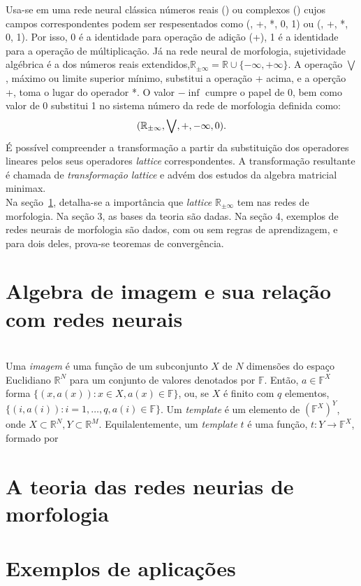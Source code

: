 \documentclass[12pt]{article}
\begin{document}
    Usa-se em uma rede neural clássica números reais () ou complexos () cujos campos correspondentes podem ser respesentados como (, +, *, 0, 1) ou (, +, *, 0, 1).
    Por isso, 0 é a identidade para operação de adição (+), 1 é a identidade para a operação de múltiplicação.
    Já na rede neural de morfologia, sujetividade algébrica é a  dos números reais extendidos,$\mathbb{R}_{\pm\infty} = \mathbb{R} \cup \{-\infty, +\infty\}$.
    A operação $\bigvee$, máximo ou limite superior mínimo, substitui a operação + acima, e a operção +, toma o lugar do operador *.
    O valor $-\inf$ cumpre o papel de 0, bem como valor de 0 substitui 1 no sistema número da rede de morfologia definida como:\\
    \begin{equation}
    (\mathbb{R}_{\pm\infty}, \bigvee, +, -\infty, 0)
        .\\\label{eq:equation3}
    \end{equation}
    É possível compreender a transformação a partir da substituição dos operadores lineares pelos seus operadores \textit{lattice} correspondentes.
    A transformação resultante é chamada de \textit{transformação lattice} e advém dos estudos da algebra matricial minimax.\\
    Na seção~\ref{sec:algebra-de-imagem-e-sua-relacao-com-redes-neurais}, detalha-se a importância que \textit{lattice} $\mathbb{R}_{\pm\infty}$ tem nas redes de morfologia.
    Na seção 3, as bases da teoria são dadas.
    Na seção 4, exemplos de redes neurais de morfologia são dados, com ou sem regras de aprendizagem, e para dois deles, prova-se teoremas de convergência.


    \section{Algebra de imagem e sua relação com redes neurais} \label{sec:algebra-de-imagem-e-sua-relacao-com-redes-neurais}\\
    Uma \textit{imagem} é uma função de um subconjunto $X$ de $N$ dimensões do espaço Euclidiano $\mathbb{R}^N$ para um conjunto de valores denotados por $\mathbb{F}$.
    Então, $a \in \mathbb{F}^X$ forma $\{(x,a(x)): x \in X, a(x) \in \mathbb{F}\}$, ou, se $X$ é finito com $q$ elementos, $\{(i,a(i)): i=1, \dots, q, a(i) \in \mathbb{F}\}$.
    Um \textit{template} é um elemento de $(\mathbb{F}^X)^Y$, onde $X \subset \mathbb{R}^N, Y \subset \mathbb{R}^M$.
    Equilalentemente, um \textit{template} $t$ é uma função, $t: Y \rightarrow \mathbb{F}^X$, formado por


    \section{A teoria das redes neurias de morfologia} \label{sec:a-teoria-das-redes-neurias-de-morfologia}


    \section{Exemplos de aplicações} \label{sec:exemplos-de-aplicacoes}
\end{document}
